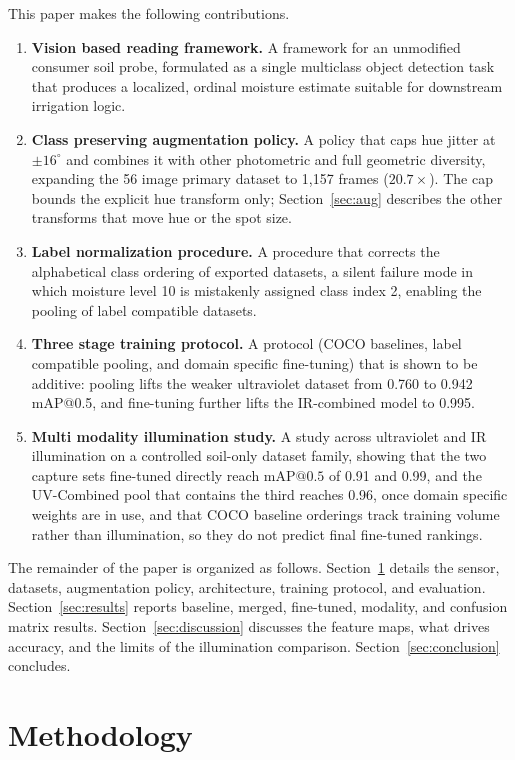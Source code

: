 ﻿\documentclass[journal]{IEEEtran}
\begin{document}
This paper makes the following contributions.
\begin{enumerate}
\item \textbf{Vision based reading framework.} A framework for an unmodified consumer soil probe, formulated as a single multiclass object detection task that produces a localized, ordinal moisture estimate suitable for downstream irrigation logic.
\item \textbf{Class preserving augmentation policy.} A policy that caps hue jitter at $\pm 16^{\circ}$ and combines it with other photometric and full geometric diversity, expanding the 56 image primary dataset to 1{,}157 frames ($20.7\times$). The cap bounds the explicit hue transform only; Section~\ref{sec:aug} describes the other transforms that move hue or the spot size.
\item \textbf{Label normalization procedure.} A procedure that corrects the alphabetical class ordering of exported datasets, a silent failure mode in which moisture level 10 is mistakenly assigned class index 2, enabling the pooling of label compatible datasets.
\item \textbf{Three stage training protocol.} A protocol (COCO baselines, label compatible pooling, and domain specific fine-tuning) that is shown to be additive: pooling lifts the weaker ultraviolet dataset from 0.760 to 0.942 mAP@0.5, and fine-tuning further lifts the IR-combined model to 0.995.
\item \textbf{Multi modality illumination study.} A study across ultraviolet and IR illumination on a controlled soil-only dataset family, showing that the two capture sets fine-tuned directly reach $\text{mAP@0.5}$ of 0.91 and 0.99, and the UV-Combined pool that contains the third reaches 0.96, once domain specific weights are in use, and that COCO baseline orderings track training volume rather than illumination, so they do not predict final fine-tuned rankings.
\end{enumerate}

The remainder of the paper is organized as follows. Section~\ref{sec:method} details the sensor, datasets, augmentation policy, architecture, training protocol, and evaluation. Section~\ref{sec:results} reports baseline, merged, fine-tuned, modality, and confusion matrix results. Section~\ref{sec:discussion} discusses the feature maps, what drives accuracy, and the limits of the illumination comparison. Section~\ref{sec:conclusion} concludes.

\section{Methodology}
\label{sec:method}
\end{document}
